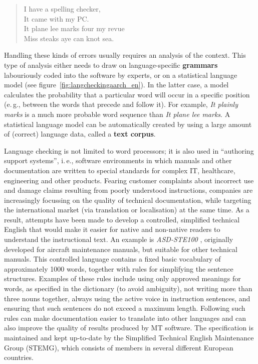 \begin{multicols}{2}
\begin{quote}
  I have a spelling checker,\\
  It came with my PC.\\
  It plane lee marks four my revue\\
  Miss steaks aye can knot sea.
\end{quote}

Handling these kinds of errors usually requires an analysis of the context. This type of analysis either needs to draw on language-specific \textbf{grammars} labouriously coded into the software by experts, or on a statistical language model (see figure~\ref{fig:langcheckingaarch_en}). In the latter case, a model calculates the probability that a particular word will occur in a specific position (e.\,g., between the words that precede and follow it). For example, \textit{It plainly marks} is a much more probable word sequence than \textit{It plane lee marks}. A statistical language model can be automatically created by using a large amount of (correct) language data, called a \textbf{text corpus}.

Language checking is not limited to word processors; it is also used in “authoring support systems”, i.\,e., software environments in which manuals and other documentation are written to special standards for complex IT, healthcare, engineering and other products. Fearing customer complaints about incorrect use and damage claims resulting from poorly understood instructions, companies are increasingly focussing on the quality of technical documentation, while targeting the international market (via translation or localisation) at the same time. As a result, attempts have been made to develop a controlled, simplified technical English that would make it easier for native and non-native readers to understand the instructional text. An example is \textit{ASD-STE100} \cite{asd}, originally developed for aircraft maintenance manuals, but suitable for other technical manuals. This controlled language contains a fixed basic vocabulary of approximately 1000 words, together with rules for simplifying the sentence structures. Examples of these rules include using only approved meanings for words, as specified in the dictionary (to avoid ambiguity), not writing more than three nouns together, always using the active voice in instruction sentences, and ensuring that such sentences do not exceed a maximum length. Following such rules can make documentation easier to translate into other languages and can also improve the quality of results produced by MT software. The specification is maintained and kept up-to-date by the Simplified Technical English Maintenance Group (STEMG), which consists of members in several different European countries.


\end{multicols}
